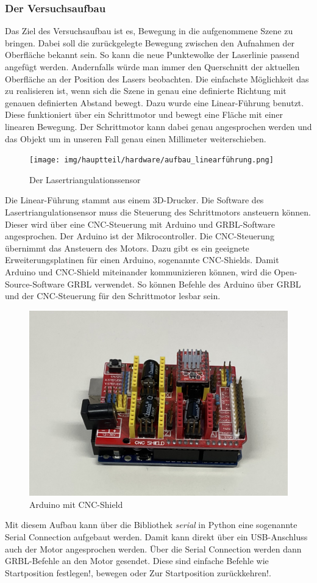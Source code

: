 		\subsubsection{Der Versuchsaufbau}
		Das Ziel des Versuchsaufbau ist es, Bewegung in die aufgenommene Szene zu bringen. Dabei soll die zurückgelegte Bewegung zwischen den Aufnahmen der Oberfläche bekannt sein. So kann die neue Punktewolke der Laserlinie passend angefügt werden. Andernfalls würde man immer den Querschnitt der aktuellen Oberfläche an der Position des Lasers beobachten. Die einfachste Möglichkeit das zu realisieren ist, wenn sich die Szene in genau eine definierte Richtung mit genauen definierten Abstand bewegt. Dazu wurde eine Linear-Führung benutzt. Diese funktioniert über ein Schrittmotor und bewegt eine Fläche mit einer linearen Bewegung. Der Schrittmotor kann dabei genau angesprochen werden und das Objekt um in unseren Fall genau einen Millimeter weiterschieben.
		\begin{figure}[h]
			\centering
			\texttt{[image: img/hauptteil/hardware/aufbau\_linearführung.png]}
			\caption{Der Lasertriangulationssensor}
			\label{fig:aufbau_scanner}
		\end{figure}
		Die Linear-Führung stammt aus einem 3D-Drucker. Die Software des Lasertriangulationsensor muss die Steuerung des Schrittmotors ansteuern können. Dieser wird über eine CNC-Steuerung mit Arduino und GRBL-Software angesprochen. Der Arduino ist der Mikrocontroller. Die CNC-Steuerung übernimmt das Ansteuern des Motors. Dazu gibt es ein geeignete Erweiterungsplatinen für einen Arduino, sogenannte CNC-Shields. Damit Arduino und CNC-Shield miteinander kommunizieren können, wird die Open-Source-Software GRBL verwendet. So können Befehle des Arduino über GRBL und der CNC-Steuerung für den Schrittmotor lesbar sein.
		\begin{figure}[h]
			\centering
			\includegraphics[width=0.45\linewidth]{img/hauptteil/hardware/arduino.png}
			\caption{Arduino mit CNC-Shield}
			\label{fig:arduino}
		\end{figure}
		Mit diesem Aufbau kann über die Bibliothek \textit{serial} in Python eine sogenannte \glqq Serial Connection\grqq{} aufgebaut werden. Damit kann direkt über ein USB-Anschluss auch der Motor angesprochen werden. Über die Serial Connection werden dann GRBL-Befehle an den Motor gesendet. Diese sind einfache Befehle wie \glqq Startposition festlegen!\grqq{}, \glqq 1mm bewegen\grqq{} oder \glqq Zur Startposition zurückkehren!\grqq{}.
		
